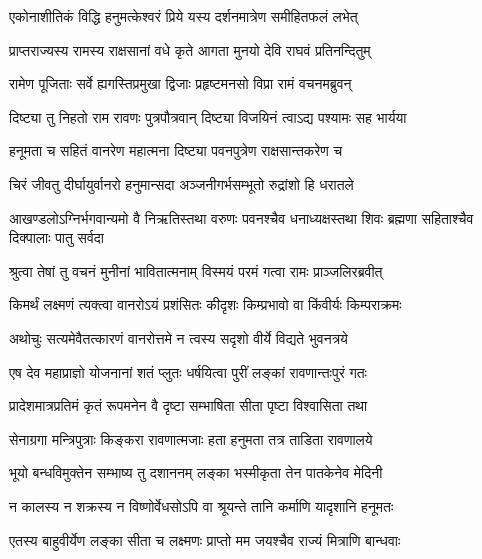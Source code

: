 \storymeta





\twolineshloka
{एकोनाशीतिकं विद्धि हनुमत्केश्वरं प्रिये}
{यस्य दर्शनमात्रेण समीहितफलं लभेत्}%

\twolineshloka
{प्राप्तराज्यस्य रामस्य राक्षसानां वधे कृते}
{आगता मुनयो देवि राघवं प्रतिनन्दितुम्}%

\twolineshloka
{रामेण पूजिताः सर्वे ह्यगस्तिप्रमुखा द्विजाः}
{प्रहृष्टमनसो विप्रा रामं वचनमब्रुवन्}%

\twolineshloka
{दिष्ट्या तु निहतो राम रावणः पुत्रपौत्रवान्}
{दिष्ट्या विजयिनं त्वाऽद्य पश्यामः सह भार्यया}%

\twolineshloka
{हनूमता च सहितं वानरेण महात्मना}
{दिष्ट्या पवनपुत्रेण राक्षसान्तकरेण च}%

\twolineshloka
{चिरं जीवतु दीर्घायुर्वानरो हनुमान्सदा}
{अञ्जनीगर्भसम्भूतो रुद्रांशो हि धरातले}%

\threelineshloka
{आखण्डलोऽग्निर्भगवान्यमो वै निऋतिस्तथा}
{वरुणः पवनश्चैव धनाध्यक्षस्तथा शिवः}
{ब्रह्मणा सहिताश्चैव दिक्पालाः पातु सर्वदा}%

\twolineshloka
{श्रुत्वा तेषां तु वचनं मुनीनां भावितात्मनाम्}
{विस्मयं परमं गत्वा रामः प्राञ्जलिरब्रवीत्}%

\twolineshloka
{किमर्थं लक्ष्मणं त्यक्त्वा वानरोऽयं प्रशंसितः}
{कीदृशः किम्प्रभावो वा किंवीर्यः किम्पराक्रमः}%

\twolineshloka
{अथोचुः सत्यमेवैतत्कारणं वानरोत्तमे}
{न त्वस्य सदृशो वीर्ये विद्यते भुवनत्रये}%

\twolineshloka
{एष देव महाप्राज्ञो योजनानां शतं प्लुतः}
{धर्षयित्वा पुरीं लङ्कां रावणान्तःपुरं गतः}%

\twolineshloka
{प्रादेशमात्रप्रतिमं कृतं रूपमनेन वै}
{दृष्टा सम्भाषिता सीता पृष्टा विश्वासिता तथा}%

\twolineshloka
{सेनाग्रगा मन्त्रिपुत्राः किङ्करा रावणात्मजाः}
{हता हनुमता तत्र ताडिता रावणालये}%

\twolineshloka
{भूयो बन्धविमुक्तेन सम्भाष्य तु दशाननम्}
{लङ्का भस्मीकृता तेन पातकेनेव मेदिनी}%

\twolineshloka
{न कालस्य न शक्रस्य न विष्णोर्वेधसोऽपि वा}
{श्रूयन्ते तानि कर्माणि यादृशानि हनूमतः}%


\twolineshloka
{एतस्य बाहुवीर्येण लङ्का सीता च लक्ष्मणः}
{प्राप्तो मम जयश्चैव राज्यं मित्राणि बान्धवाः}%

